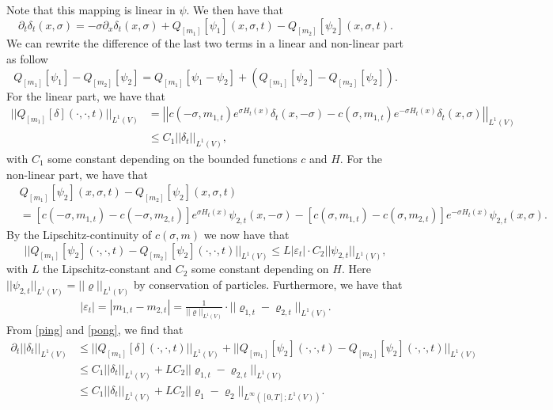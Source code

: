 \documentclass[11pt]{article}
\numberwithin{equation}{section}
\theoremstyle{definition}
\theoremstyle{plain}
\begin{document}
Note that this mapping is linear in $\psi$. We then have that 
\begin{equation}
    \partial_t \delta_t(x,\sigma) = -\sigma \partial_x\delta_t(x,\sigma) + Q_{[m_1]}[\psi_1](x,\sigma,t) - Q_{[m_2]}[\psi_2](x,\sigma,t).
\end{equation}
We can rewrite the difference of the last two terms in a linear and non-linear part as follow 
\begin{equation}
    Q_{[m_1]}[\psi_1]- Q_{[m_2]}[\psi_2]
    = Q_{[m_1]}[\psi_1 - \psi_2] + \left(Q_{[m_1]}[\psi_2] - Q_{[m_2]}[\psi_2] \right).
\end{equation}
For the linear part, we have that 
\begin{align}\label{ping}
    \nonumber||Q_{[m_1]}[\delta](\cdot,\cdot,t)||_{L^1(V)} 
    &= \left|\left|  c(-\sigma,m_{1,t})e^{\sigma H_t(x)}\delta_t(x,-\sigma) - c(\sigma,m_{1,t})e^{-\sigma H_t(x)}\delta_t(x,\sigma)\right|\right|_{L^1(V)}\\
    &\leq C_1||\delta_t||_{L^1(V)},
\end{align}
with $C_1$ some constant depending on the bounded functions $c$ and $H$. For the non-linear part, we have that 
\begin{align}
    \nonumber&Q_{[m_1]}[\psi_2](x,\sigma,t) - Q_{[m_2]}[\psi_2](x,\sigma,t)\\
    &= [c(-\sigma,m_{1,t}) - c(-\sigma,m_{2,t})]e^{\sigma H_t(x)}\psi_{2,t}(x,-\sigma) - [c(\sigma,m_{1,t}) - c(\sigma,m_{2,t})]e^{-\sigma H_t(x)}\psi_{2,t}(x,\sigma).
\end{align}
By the Lipschitz-continuity of $c(\sigma,m)$ we now have that 
\begin{equation}\label{pong}
    ||Q_{[m_1]}[\psi_2](\cdot,\cdot,t) - Q_{[m_2]}[\psi_2](\cdot,\cdot,t)||_{L^1(V)} \leq L|\varepsilon_t|\cdot C_2||\psi_{2,t}||_{L^1(V)},
\end{equation}
with $L$ the Lipschitz-constant and $C_2$ some constant depending on $H$. Here $||\psi_{2,t}||_{L^1(V)} = ||\varrho||_{L^1(V)}$  by conservation of particles. Furthermore, we have that 
\begin{align}
    |\varepsilon_t| 
    = |m_{1,t}-m_{2,t}|
    = \frac{1}{||\varrho||_{L^1(V)}} \cdot ||\varrho_{1,t} - \varrho_{2,t}||_{L^1(V)}.
\end{align}
From \eqref{ping} and \eqref{pong}, we find that 
\begin{align}
    \nonumber\partial_t||\delta_t||_{L^1(V)} 
    &\leq ||Q_{[m_1]}[\delta](\cdot,\cdot,t)||_{L^1(V)}  +   ||Q_{[m_1]}[\psi_2](\cdot,\cdot,t) - Q_{[m_2]}[\psi_2](\cdot,\cdot,t)||_{L^1(V)} \\
    \nonumber
    &\leq C_1||\delta_{t}||_{L^1(V)} + LC_2||\varrho_{1,t} - \varrho_{2,t}||_{L^1(V)}\\
    &\leq C_1||\delta_{t}||_{L^1(V)} + LC_2||\varrho_{1} - \varrho_{2}||_{L^\infty([0,T];L^1(V))}.
\end{align}
\end{document}
